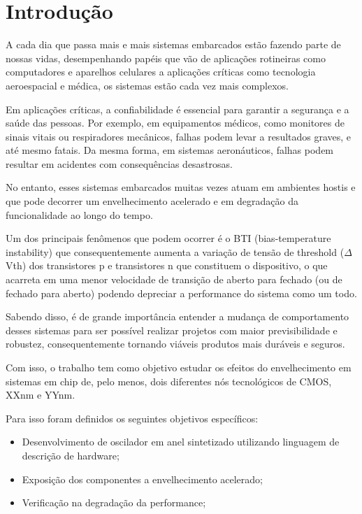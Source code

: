 	\chapter{Introdução}

A cada dia que passa mais e mais sistemas embarcados estão fazendo parte de nossas vidas, desempenhando papéis que vão de aplicações rotineiras como computadores e aparelhos celulares a aplicações críticas como tecnologia aeroespacial e médica, os sistemas estão cada vez mais complexos.

Em aplicações críticas, a confiabilidade é essencial para garantir a segurança e a saúde das pessoas. Por exemplo, em equipamentos médicos, como monitores de sinais vitais ou respiradores mecânicos, falhas podem levar a resultados graves, e até mesmo fatais. Da mesma forma, em sistemas aeronáuticos, falhas podem resultar em acidentes com consequências desastrosas.

No entanto, esses sistemas embarcados muitas vezes atuam em ambientes hostis e que pode decorrer um envelhecimento acelerado e em degradação da funcionalidade ao longo do tempo.

Um dos principais fenômenos que podem ocorrer é o BTI (bias-temperature instability) que consequentemente aumenta a variação de tensão de threshold ($\Delta$Vth) dos transistores p e transistores n que constituem o dispositivo, o que acarreta em uma menor velocidade de transição de aberto para fechado (ou de fechado para aberto) podendo depreciar a performance do sistema como um todo.

Sabendo disso, é de grande importância entender a mudança de comportamento desses sistemas para ser possível realizar projetos com maior previsibilidade e robustez, consequentemente tornando viáveis produtos mais duráveis e seguros.

Com isso, o trabalho tem como objetivo estudar os efeitos do envelhecimento em sistemas em chip de, pelo menos, dois diferentes nós tecnológicos de CMOS, XXnm e YYnm.

Para isso foram definidos os seguintes objetivos específicos:
\begin{itemize}
    \item Desenvolvimento de oscilador em anel sintetizado utilizando linguagem de descrição de hardware;
    \item Exposição dos componentes a envelhecimento acelerado;
    \item Verificação na degradação da performance;
\end{itemize}
